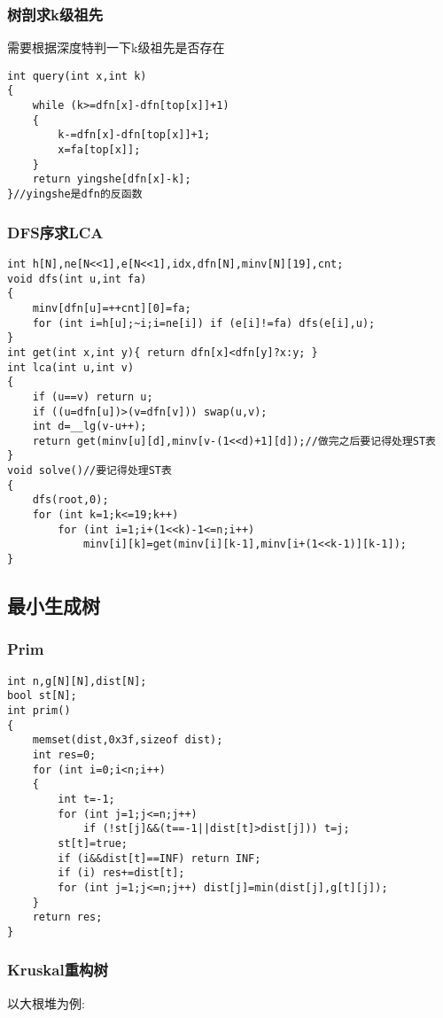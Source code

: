 \documentclass[a4paper]{ctexart}
\begin{document}
\subsubsection{树剖求k级祖先}
需要根据深度特判一下k级祖先是否存在
\begin{lstlisting}
int query(int x,int k)
{
    while (k>=dfn[x]-dfn[top[x]]+1)
    {
        k-=dfn[x]-dfn[top[x]]+1;
        x=fa[top[x]];
    }
    return yingshe[dfn[x]-k];
}//yingshe是dfn的反函数
\end{lstlisting}

\subsubsection{DFS序求LCA}
\begin{lstlisting}
int h[N],ne[N<<1],e[N<<1],idx,dfn[N],minv[N][19],cnt;
void dfs(int u,int fa)
{
    minv[dfn[u]=++cnt][0]=fa;
    for (int i=h[u];~i;i=ne[i]) if (e[i]!=fa) dfs(e[i],u);
}
int get(int x,int y){ return dfn[x]<dfn[y]?x:y; }
int lca(int u,int v)
{
    if (u==v) return u;
    if ((u=dfn[u])>(v=dfn[v])) swap(u,v);
    int d=__lg(v-u++);
    return get(minv[u][d],minv[v-(1<<d)+1][d]);//做完之后要记得处理ST表
}
void solve()//要记得处理ST表
{
    dfs(root,0);
    for (int k=1;k<=19;k++)
        for (int i=1;i+(1<<k)-1<=n;i++)
            minv[i][k]=get(minv[i][k-1],minv[i+(1<<k-1)][k-1]);
}
\end{lstlisting}

\subsection{最小生成树}
\subsubsection{Prim}
\begin{lstlisting}
int n,g[N][N],dist[N];
bool st[N];
int prim()
{
    memset(dist,0x3f,sizeof dist);
    int res=0;
    for (int i=0;i<n;i++)
    {
        int t=-1;
        for (int j=1;j<=n;j++)
            if (!st[j]&&(t==-1||dist[t]>dist[j])) t=j;
        st[t]=true;
        if (i&&dist[t]==INF) return INF;
        if (i) res+=dist[t];
        for (int j=1;j<=n;j++) dist[j]=min(dist[j],g[t][j]);
    }
    return res;
}
\end{lstlisting}

\subsubsection{Kruskal重构树}
以大根堆为例:
\end{document}
